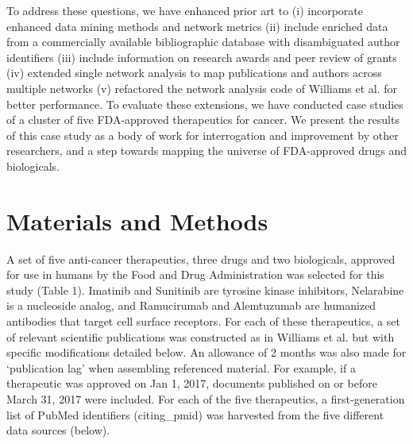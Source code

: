 \documentclass[10pt,letterpaper]{article}
\begin{document}
To address these questions, we have enhanced prior art to (i) incorporate enhanced data mining methods and network metrics (ii) include enriched data from a commercially available bibliographic database with disambiguated author identifiers (iii) include information on research awards and peer review of grants (iv) extended single network analysis to map publications and authors across multiple networks (v) refactored the network analysis code of Williams et al. for better performance. To evaluate these extensions, we have conducted case studies of a cluster of five FDA-approved therapeutics for cancer. We present the results of this case study as a body of work for interrogation and improvement by other researchers, and a step towards mapping the universe of FDA-approved drugs and biologicals.

\section*{Materials and Methods}  A set of five anti-cancer therapeutics, three drugs and two biologicals, approved for use in humans by the Food and Drug Administration was selected for this study (Table 1). Imatinib and Sunitinib are tyrosine kinase inhibitors, Nelarabine is a nucleoside analog, and Ramucirumab and Alemtuzumab are humanized antibodies that target cell surface receptors. For each of these therapeutics, a set of relevant scientific publications was constructed as in Williams et al.\cite{bibWilliams} but with specific modifications detailed below. An allowance of 2 months was also made for `publication lag' when assembling referenced material. For example, if a therapeutic was approved on Jan 1, 2017, documents published  on or before March 31, 2017 were included. For each of the five therapeutics, a first-generation list of PubMed identifiers (citing\_pmid) was harvested from the five different data sources (below). 
 
\end{document}

